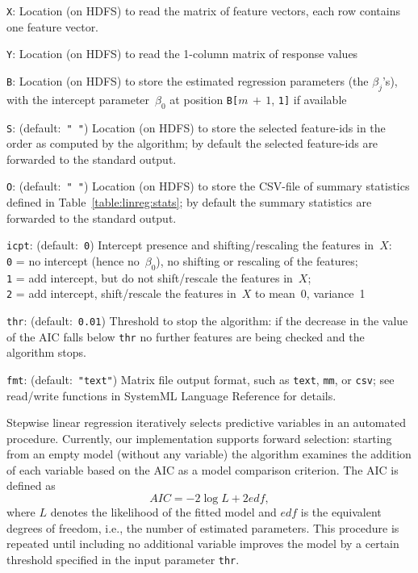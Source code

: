 \smallskip
{}
\begin{Description}
\item[{\tt X}:]
Location (on HDFS) to read the matrix of feature vectors, each row contains
one feature vector.
\item[{\tt Y}:]
Location (on HDFS) to read the 1-column matrix of response values
\item[{\tt B}:]
Location (on HDFS) to store the estimated regression parameters (the $\beta_j$'s), with the
intercept parameter~$\beta_0$ at position {\tt B[}$m\,{+}\,1$, {\tt 1]} if available
\item[{\tt S}:] (default:\mbox{ }{\tt " "})
Location (on HDFS) to store the selected feature-ids in the order as computed by the algorithm;
by default the selected feature-ids are forwarded to the standard output.
\item[{\tt O}:] (default:\mbox{ }{\tt " "})
Location (on HDFS) to store the CSV-file of summary statistics defined in
Table~\ref{table:linreg:stats}; by default the summary statistics are forwarded to the standard output.
\item[{\tt icpt}:] (default:\mbox{ }{\tt 0})
Intercept presence and shifting/rescaling the features in~$X$:\\
{\tt 0} = no intercept (hence no~$\beta_0$), no shifting or rescaling of the features;\\
{\tt 1} = add intercept, but do not shift/rescale the features in~$X$;\\
{\tt 2} = add intercept, shift/rescale the features in~$X$ to mean~0, variance~1
\item[{\tt thr}:] (default:\mbox{ }{\tt 0.01})
Threshold to stop the algorithm: if the decrease in the value of the AIC falls below {\tt thr}
no further features are being checked and the algorithm stops.
\item[{\tt fmt}:] (default:\mbox{ }{\tt "text"})
Matrix file output format, such as {\tt text}, {\tt mm}, or {\tt csv};
see read/write functions in SystemML Language Reference for details.
\end{Description}


\smallskip

Stepwise linear regression iteratively selects predictive variables in an automated procedure.
Currently, our implementation supports forward selection: starting from an empty model (without any variable) 
the algorithm examines the addition of each variable based on the AIC as a model comparison criterion. The AIC is defined as  
\begin{equation}
AIC = -2 \log{L} + 2 edf,\label{eq:AIC}
\end{equation}    
where $L$ denotes the likelihood of the fitted model and $edf$ is the equivalent degrees of freedom, i.e., the number of estimated parameters. 
This procedure is repeated until including no additional variable improves the model by a certain threshold 
specified in the input parameter {\tt thr}. 

